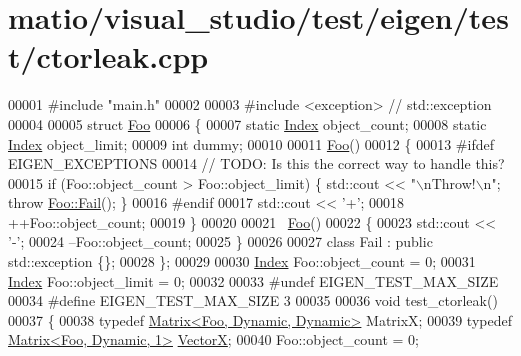 \hypertarget{matio_2visual__studio_2test_2eigen_2test_2ctorleak_8cpp_source}{}\section{matio/visual\+\_\+studio/test/eigen/test/ctorleak.cpp}
\label{matio_2visual__studio_2test_2eigen_2test_2ctorleak_8cpp_source}

\begin{DoxyCode}
00001 \textcolor{preprocessor}{#include "main.h"}
00002 
00003 \textcolor{preprocessor}{#include <exception>}  \textcolor{comment}{// std::exception}
00004 
00005 \textcolor{keyword}{struct }\hyperlink{struct_foo}{Foo}
00006 \{
00007   \textcolor{keyword}{static} \hyperlink{namespace_eigen_a62e77e0933482dafde8fe197d9a2cfde}{Index} object\_count;
00008   \textcolor{keyword}{static} \hyperlink{namespace_eigen_a62e77e0933482dafde8fe197d9a2cfde}{Index} object\_limit;
00009   \textcolor{keywordtype}{int} dummy;
00010 
00011   \hyperlink{struct_foo}{Foo}()
00012   \{
00013 \textcolor{preprocessor}{#ifdef EIGEN\_EXCEPTIONS}
00014     \textcolor{comment}{// TODO: Is this the correct way to handle this?}
00015     \textcolor{keywordflow}{if} (Foo::object\_count > Foo::object\_limit) \{ std::cout << \textcolor{stringliteral}{"\(\backslash\)nThrow!\(\backslash\)n"}; \textcolor{keywordflow}{throw} 
      \hyperlink{class_foo_1_1_fail}{Foo::Fail}(); \}
00016 \textcolor{preprocessor}{#endif}
00017       std::cout << \textcolor{charliteral}{'+'};
00018     ++Foo::object\_count;
00019   \}
00020 
00021   ~\hyperlink{struct_foo}{Foo}()
00022   \{
00023       std::cout << \textcolor{charliteral}{'-'};
00024     --Foo::object\_count;
00025   \}
00026 
00027   \textcolor{keyword}{class }Fail : \textcolor{keyword}{public} std::exception \{\};
00028 \};
00029 
00030 \hyperlink{namespace_eigen_a62e77e0933482dafde8fe197d9a2cfde}{Index} Foo::object\_count = 0;
00031 \hyperlink{namespace_eigen_a62e77e0933482dafde8fe197d9a2cfde}{Index} Foo::object\_limit = 0;
00032 
00033 \textcolor{preprocessor}{#undef EIGEN\_TEST\_MAX\_SIZE}
00034 \textcolor{preprocessor}{#define EIGEN\_TEST\_MAX\_SIZE 3}
00035 
00036 \textcolor{keywordtype}{void} test\_ctorleak()
00037 \{
00038   \textcolor{keyword}{typedef} \hyperlink{group___core___module_class_eigen_1_1_matrix}{Matrix<Foo, Dynamic, Dynamic>} MatrixX;
00039   \textcolor{keyword}{typedef} \hyperlink{group___core___module_class_eigen_1_1_matrix}{Matrix<Foo, Dynamic, 1>} \hyperlink{group___core___module}{VectorX};
00040   Foo::object\_count = 0;

\end{DoxyCode}
